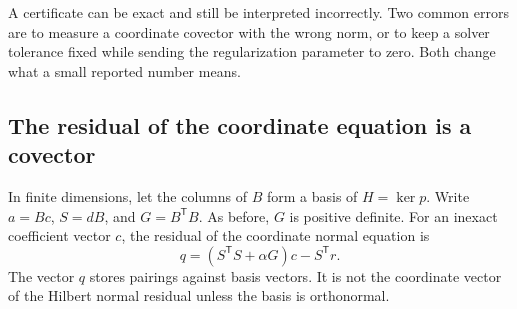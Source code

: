 \label{sec:stopping-rules}
A certificate can be exact and still be interpreted incorrectly. Two common errors are to measure a coordinate covector with the wrong norm, or to keep a solver tolerance fixed while sending the regularization parameter to zero. Both change what a small reported number means.

\subsection{The residual of the coordinate equation is a covector}
In finite dimensions, let the columns of $B$ form a basis of $H=\ker p$. Write $a=Bc$, $S=dB$, and $G=B^{\mathsf T}B$. As before, $G$ is positive definite. For an inexact coefficient vector $c$, the residual of the coordinate normal equation is
\[
 q=(S^{\mathsf T}S+\alpha G)c-S^{\mathsf T}r.
\]
The vector $q$ stores pairings against basis vectors. It is not the coordinate vector of the Hilbert normal residual unless the basis is orthonormal.

